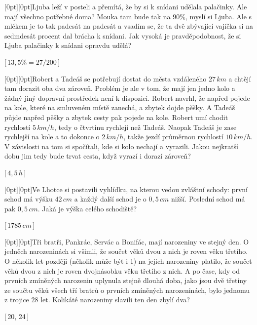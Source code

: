 \documentclass[10pt, notitlepage]{article}
\def \ifzadani{\ifx\reseni\undefined}
\def \cislotymu {42}%
\def \printcislotymu {\llap{\it(\cislotymu) \qquad}}
\newcommand{\priklad}[2]{
    \begin{minipage}{\textwidth}
    \item \noindent \printcislotymu \raisebox{0pt}[0pt][0pt]{\llap{\raisebox{-5.3ex}{\qrcode{T\cislotymu P\number\numexpr\value{enumi}\relax} \enskip}}}#1
    \ifzadani
        \vspace{45pt}
    \else
        \begin{flushright}\vspace{-6pt} [$\,$#2$\,$]\vspace{28pt}\end{flushright}
    \fi
    \end{minipage}}
\begin{document}
\begin{enumerate}
  \priklad{Ljuba leží v posteli a přemítá, že by si k snídani udělala palačinky. Ale mají všechno potřebné doma? Mouka tam bude tak na 90\%, myslí si Ljuba. Ale s mlékem je to tak padesát na padesát a vsadím se, že ta dvě zbývající vajíčka si na sedmdesát procent dal brácha k snídani. Jak vysoká je pravděpodobnost, že si Ljuba palačinky k snídani opravdu udělá?}{$ 13{,}5\% = 27/200 $}
  
  
  \priklad{Robert a Tadeáš se potřebují dostat do města vzdáleného $ 27\,km $ a chtějí tam dorazit oba dva zároveň. Problém je ale v tom, že mají jen jedno kolo a žádný jiný dopravní prostředek není k dispozici. Robert navrhl, že napřed pojede na kole, které na smluveném místě zanechá, a zbytek dojde pěšky. A Tadeáš půjde napřed pěšky a zbytek cesty pak pojede na kole. Robert umí chodit rychlostí $ 5\,km/h $, tedy o čtvrtinu rychleji než Tadeáš. Naopak Tadeáš je zase rychlejší na kole a to dokonce o $ 2\,km/h $, takže jezdí průměrnou rychlostí $ 10\,km/h $. V závislosti na tom si spočítali, kde si kolo nechají a vyrazili. Jakou nejkratší dobu jim tedy bude trvat cesta, když vyrazí i dorazí zároveň?}{$ 4{,}5\,h $}
  
  
  \priklad{Ve Lhotce si postavili vyhlídku, na kterou vedou zvláštní schody: první schod má výšku $ 42\,cm $ a každý další schod je o $ 0{,}5\,cm $ nižší. Poslední schod má pak $ 0,5\,cm $. Jaká je výška celého schodiště?}{$ 1785\,cm $}
  
  
  \priklad{Tři bratři, Pankrác, Servác a Bonifác, mají narozeniny ve stejný den. O jedněch narozeninách si všimli, že součet věků dvou z nich je roven věku třetího. O několik let později (několik může být i 1) na jejich narozeniny platilo, že součet věků dvou z nich je roven dvojnásobku věku třetího z nich. A po čase, kdy od prvních zmíněných narozenin uplynula stejně dlouhá doba, jako jsou dvě třetiny ze součtu věků všech tří bratrů o prvních zmíněných narozeninách, bylo jednomu z trojice 28 let. Kolikáté narozeniny slavili ten den zbylí dva?}{20, 24}
  
  
  
  \end{enumerate}
  
\end{document}
